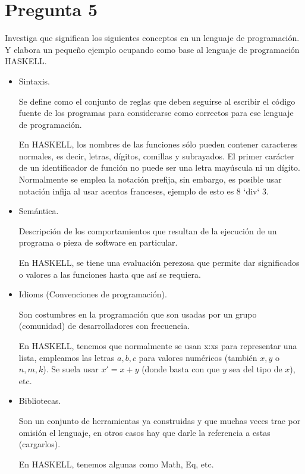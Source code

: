 \newpage
\section*{Pregunta 5}
Investiga que significan los siguientes conceptos en un lenguaje de programación.
Y elabora un pequeño ejemplo ocupando como base al lenguaje de programación HASKELL.
\begin{itemize}
\item Sintaxis.

Se define como el conjunto de reglas que deben seguirse al escribir el código fuente
de los programas para considerarse como correctos para ese lenguaje de programación.

En HASKELL, los nombres de las funciones sólo pueden contener caracteres normales,
es decir, letras, dígitos, comillas y subrayados. El primer carácter de un identificador
de función no puede ser una letra mayúscula ni un dígito. Normalmente se emplea la
notación prefija, sin embargo, es posible usar notación infija al usar acentos franceses,
ejemplo de esto es 8 `div` 3.
\item Semántica.

Descripción de los comportamientos que resultan de la ejecución de un programa o pieza de
software en particular.

En HASKELL, se tiene una evaluación perezosa que permite dar significados o valores
a las funciones hasta que así se requiera.
\item Idioms (Convenciones de programación).

Son costumbres en la programación que son usadas por un grupo (comunidad) de desarrolladores
con frecuencia.

En HASKELL, tenemos que normalmente se usan x:xs para representar una lista, empleamos
las letras $a, b, c$ para valores numéricos (también $x, y$ o $n, m, k$). Se suela
usar $x' = x + y$ (donde basta con que $y$ sea del tipo de $x$), etc.
\item Bibliotecas.

Son un conjunto de herramientas ya construidas y que muchas veces trae por omisión
el lenguaje, en otros casos hay que darle la referencia a estas (cargarlos).

En HASKELL, tenemos algunas como Math, Eq, etc.
\end{itemize}
